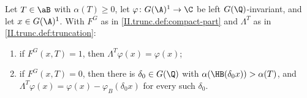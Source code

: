 Let $T\in\aB$ with $\alpha(T)\ge0$, let $\varphi\colon G(\A)^1\to\C$ be left $G(\Q)$-invariant, and let $x\in G(\A)^1$. With $F^G$ as in
\cref{II.trunc.def:compact-part} and $\Lambda^T$ as in \cref{II.trunc.def:truncation}:
\begin{enumerate}
  \item[(a)] if $F^G(x,T)=1$, then $\Lambda^T\varphi(x)=\varphi(x)$;
  \item[(b)] if $F^G(x,T)=0$, then there is $\delta_0\in G(\Q)$ with $\alpha(\HB(\delta_0x))>\alpha(T)$, and
  $\Lambda^T\varphi(x)=\varphi(x)-\varphi_B(\delta_0x)$ for every such $\delta_0$.
\end{enumerate}

